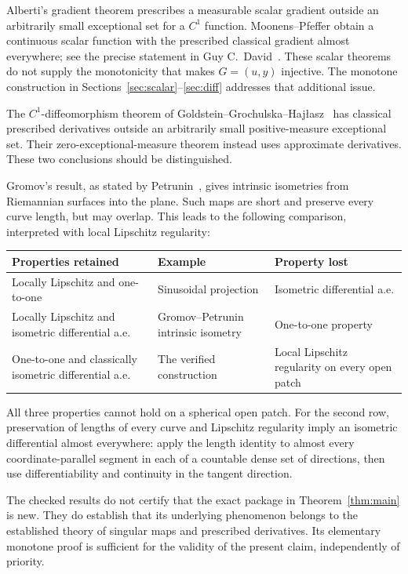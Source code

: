 \documentclass[11pt,letterpaper]{article}
\numberwithin{equation}{section}
\theoremstyle{remark}
\begin{document}
Alberti's gradient theorem prescribes a measurable scalar gradient outside an arbitrarily small exceptional set for a $C^1$ function. Moonens--Pfeffer obtain a continuous scalar function with the prescribed classical gradient almost everywhere; see the precise statement in Guy C.~David~\cite[Theorems 1.1--1.2]{david}. These scalar theorems do not supply the monotonicity that makes $G=(u,y)$ injective. The monotone construction in Sections~\ref{sec:scalar}--\ref{sec:diff} addresses that additional issue.

The $C^1$-diffeomorphism theorem of Goldstein--Grochulska--Haj\l asz~\cite[Theorem 1.2]{ggh} has classical prescribed derivatives outside an arbitrarily small positive-measure exceptional set. Their zero-exceptional-measure theorem instead uses approximate derivatives. These two conclusions should be distinguished.

Gromov's result, as stated by Petrunin~\cite[Theorem 1.2]{petrunin}, gives intrinsic isometries from Riemannian surfaces into the plane. Such maps are short and preserve every curve length, but may overlap. This leads to the following comparison, interpreted with local Lipschitz regularity:

\begin{center}
\small
\begin{tabular}{p{}p{}p{}}
\toprule
Properties retained & Example & Property lost\\
\midrule
Locally Lipschitz and one-to-one & Sinusoidal projection & Isometric differential a.e.\\[0.5em]
Locally Lipschitz and isometric differential a.e. & Gromov--Petrunin intrinsic isometry & One-to-one property\\[0.5em]
One-to-one and classically isometric differential a.e. & The verified construction & Local Lipschitz regularity on every open patch\\
\bottomrule
\end{tabular}
\end{center}

All three properties cannot hold on a spherical open patch. For the second row, preservation of lengths of every curve and Lipschitz regularity imply an isometric differential almost everywhere: apply the length identity to almost every coordinate-parallel segment in each of a countable dense set of directions, then use differentiability and continuity in the tangent direction.

The checked results do not certify that the exact package in Theorem~\ref{thm:main} is new. They do establish that its underlying phenomenon belongs to the established theory of singular maps and prescribed derivatives. Its elementary monotone proof is sufficient for the validity of the present claim, independently of priority.
\end{document}
